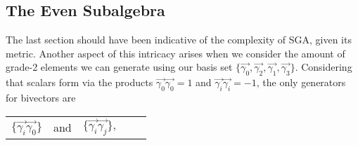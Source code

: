 \subsection{The Even Subalgebra}
The last section should have been indicative of the complexity of SGA, given its metric. Another aspect of this intricacy arises when we consider the amount of grade-2 elements we can generate using our basis set $\{ \vec{\gamma_0}, \vec{\gamma_2}, \vec{\gamma_1}, \vec{\gamma_3} \}$. Considering that scalars form via the products $\vec{\gamma_0} \vec{\gamma_0} = 1$ and $\vec{\gamma_i}\vec{\gamma_i}= -1 $, the only generators for bivectors are 
\begin{table}[H]
\centering
\begin{tabular}{ccccc}
$\{\vec{\gamma_i}\vec{\gamma_0}\}$ & and & $\{\vec{\gamma_i} \vec{\gamma_j}\},$ 
\end{tabular}
\end{table}
